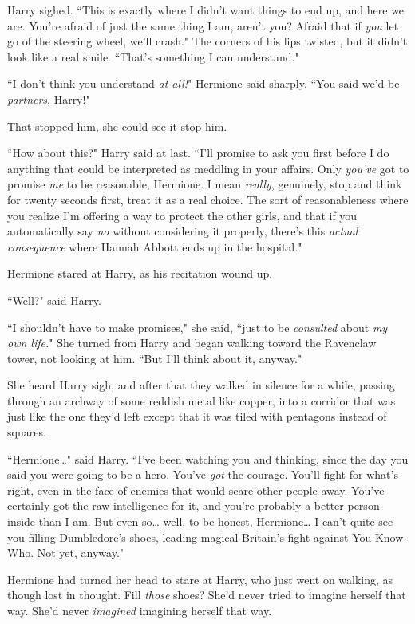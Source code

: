 Harry sighed. ``This is exactly where I didn't want things to end up, and here we are. You're afraid of just the same thing I am, aren't you? Afraid that if \emph{you} let go of the steering wheel, we'll crash." The corners of his lips twisted, but it didn't look like a real smile. ``That's something I can understand."

``I don't think you understand \emph{at all!}" Hermione said sharply. ``You said we'd be \emph{partners}, Harry!"

That stopped him, she could see it stop him.

``How about this?" Harry said at last. ``I'll promise to ask you first before I do anything that could be interpreted as meddling in your affairs. Only \emph{you've} got to promise \emph{me} to be reasonable, Hermione. I mean \emph{really}, genuinely, stop and think for twenty seconds first, treat it as a real choice. The sort of reasonableness where you realize I'm offering a way to protect the other girls, and that if you automatically say \emph{no} without considering it properly, there's this \emph{actual consequence} where Hannah Abbott ends up in the hospital."

Hermione stared at Harry, as his recitation wound up.

``Well?" said Harry.

``I shouldn't have to make promises," she said, ``just to be \emph{consulted} about \emph{my own life.}" She turned from Harry and began walking toward the Ravenclaw tower, not looking at him. ``But I'll think about it, anyway."

She heard Harry sigh, and after that they walked in silence for a while, passing through an archway of some reddish metal like copper, into a corridor that was just like the one they'd left except that it was tiled with pentagons instead of squares.

``Hermione{\ldots}" said Harry. ``I've been watching you and thinking, since the day you said you were going to be a hero. You've \emph{got} the courage. You'll fight for what's right, even in the face of enemies that would scare other people away. You've certainly got the raw intelligence for it, and you're probably a better person inside than I am. But even so{\ldots} well, to be honest, Hermione{\ldots} I can't quite see you filling Dumbledore's shoes, leading magical Britain's fight against You-Know-Who. Not yet, anyway."

Hermione had turned her head to stare at Harry, who just went on walking, as though lost in thought. Fill \emph{those} shoes? She'd never tried to imagine herself that way. She'd never \emph{imagined} imagining herself that way.

